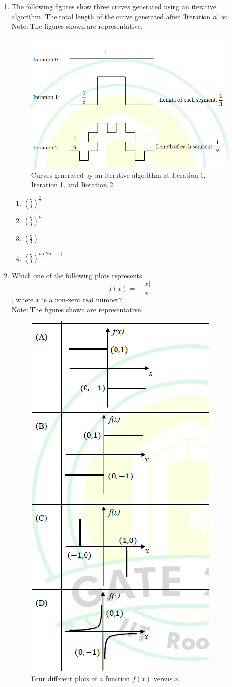 \documentclass[journal]{IEEEtran}
\begin{document}
\begin{enumerate}
    \item The following figures show three curves generated using an iterative algorithm.
The total length of the curve generated after 'Iteration $n$' is:
    \\
    Note: The figures shown are representative.
    \clearpage
\begin{figure}[!h]
        \centering
        \includegraphics[width=0.4\columnwidth]{figs/Q.4.png}
        \caption{Curves generated by an iterative algorithm at Iteration 0, Iteration 1, and Iteration 2.}
        \label{fig:Q.4}
    \end{figure}
    \begin{multicols}{2}
    \begin{enumerate}
        \item $(\frac{5}{3})^{\frac{n}{2}}$
        \item $(\frac{5}{3})^{n}$
        \item $(\frac{5}{3})$
        \item $(\frac{5}{3})^{n(2n-1)}$
    \end{enumerate}
    \end{multicols}
    
    \item Which one of the following plots represents $$f(x) = -\frac{|x|}{x}$$, where $x$ is a non-zero real number?
\\
    Note: The figures shown are representative.
\begin{figure}[!h]
        \centering
        \includegraphics[width=0.3\columnwidth]{figs/Q.5.png}
        \caption{Four different plots of a function $f(x)$ versus $x$.}
        \label{fig:Q.5}
    \end{figure}
\end{enumerate}
\end{document}
